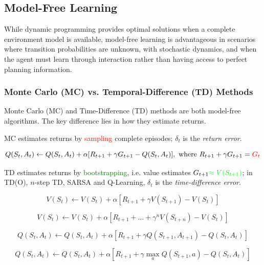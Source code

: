\documentclass[12pt]{article}
\begin{document}
\subsection{Model-Free Learning}

While dynamic programming provides optimal solutions when a complete environment model is available, model-free learning is advantageous in scenarios where transition probabilities are unknown, with stochastic dynamics, and when the agent must learn through interaction rather than having access to perfect planning information.

\subsubsection{Monte Carlo (MC) vs. Temporal-Difference (TD) Methods}

Monte Carlo (MC) and Time-Difference (TD) methods are both model-free algorithms.
The key difference lies in how they estimate returns.

MC estimates returns by \textcolor{red}{sampling} complete episodes;
$\delta_t$ is the \textit{return error}.

\begin{equation}
	Q(S_t,A_t) \leftarrow Q(S_t,A_t) + \alpha [ R_{t+1} + \gamma G_{t+1} - Q(S_t,A_t) ], \text{ where } R_{t+1} + \gamma G_{t+1} = \textcolor{red}{G_t}
\end{equation}

TD estimates returns by \textcolor{green}{bootstrapping},
i.e. value estimates $G_{t+1} \textcolor{green}{\approx V(S_{t+1})}$;
in TD(O), $n$-step TD, SARSA and Q-Learning,
$\delta_t$ is the \textit{time-difference error}.

\begin{equation}
	V(S_t) \leftarrow V(S_t) + \alpha [ R_{t+1} + \gamma V(S_{t+1}) - V(S_t) ]
\end{equation}

\begin{equation}
	V(S_t) \leftarrow V(S_t) + \alpha \left[ R_{t+1} + \dots + \gamma^n V(S_{t+n}) - V(S_t) \right]
\end{equation}

\begin{equation}
	Q(S_t,A_t) \leftarrow Q(S_t,A_t) + \alpha [ R_{t+1} + \gamma Q(S_{t+1},A_{t+1}) - Q(S_t,A_t) ]
\end{equation}

\begin{equation}
	Q(S_t,A_t) \leftarrow Q(S_t,A_t) + \alpha [ R_{t+1} + \gamma \max_{a} Q(S_{t+1},a) - Q(S_t,A_t) ]
\end{equation}
\end{document}
